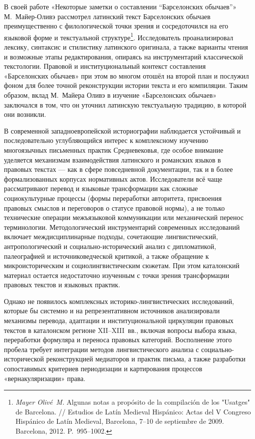 В своей работе «Некоторые заметки о составлении “Барселонских обычаев”» М.~Майер-Оливэ рассмотрел латинский текст Барселонских обычаев преимущественно с филологической точки зрения и сосредоточился на его языковой форме и текстуальной структуре\footnote{\emph{Mayer Olivé~M}\emph{.} Algunas notas a propósito de la compilación de los "Usatges" de Barcelona. // Estudios de Latín Medieval Hispánico: Actas del V Congreso Hispánico de Latín Medieval, Barcelona, 7--10 de septiembre de 2009. Barcelona, 2012. P.~995--1002.}. Исследователь проанализировал лексику, синтаксис и стилистику латинского оригинала, а также варианты чтения и возможные этапы редактирования, опираясь на инструментарий классической текстологии. Правовой и институциональный контекст составления «Барселонских обычаев» при этом во многом отошёл на второй план и послужил фоном для более точной реконструкции истории текста и его компиляции. Таким образом, вклад М.~Майера Оливэ в изучение «Барселонских обычаев» заключался в том, что он уточнил латинскую текстуальную традицию, в которой они возникли.

В современной западноевропейской историографии наблюдается устойчивый и последовательно углубляющийся интерес к комплексному изучению многоязычных письменных практик Средневековья, где особое внимание уделяется механизмам взаимодействия латинского и романских языков в правовых текстах --- как в сфере повседневной документации, так и в более формализованных корпусах нормативных актов. Исследователи всё чаще рассматривают перевод и языковые трансформации как сложные социокультурные процессы (формы переработки авторитета, присвоения правовых смыслов и переговоров о статусе правовой нормы), а не только технические операции межъязыковой коммуникации или механический перенос терминологии. Методологический инструментарий современных исследований включает междисциплинарные подходы, сочетающие лингвистический, антропологический и социально-исторический анализ с дипломатикой, палеографией и источниковедческой критикой, а также обращение к микроисторическим и социолингвистическим сюжетам. При этом каталонский материал остается недостаточно изученным с точки зрения трансформации правовых текстов и языковых практик.

Однако не появилось комплексных историко-лингвистических исследований, которые бы системно и на репрезентативном источников анализировали механизмы перевода, адаптации и институциональной циркуляции правовых текстов в каталонском регионе XII--XIII~вв., включая вопросы выбора языка, переработки формуляра и переноса правовых категорий. Восполнение этого пробела требует интеграции методов лингвистического анализа с социально-исторической реконструкцией медиаторов и практик письма, а также разработки сопоставимых критериев периодизации и картирования процессов «вернакуляризации» права.

